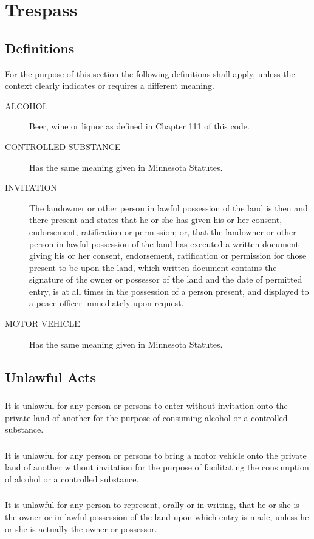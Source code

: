 \section{Trespass}
\subsection{Definitions}
For the purpose of this section the following definitions shall apply, unless the context clearly indicates or requires a different meaning.
\begin{description}
    \item[ALCOHOL] Beer, wine or liquor as defined in Chapter 111 of this code.
    \item[CONTROLLED SUBSTANCE] Has the same meaning given in Minnesota Statutes.
    \item[INVITATION] The landowner or other person in lawful possession of the land is then and there present and states that he or she has given his or her consent, endorsement, ratification or permission; or, that the landowner or other person in lawful possession of the land has executed a written document giving his or her consent, endorsement, ratification or permission for those present to be upon the land, which written document contains the signature of the owner or possessor of the land and the date of permitted entry, is at all times in the possession of a person present, and displayed to a peace officer immediately upon request.
    \item[MOTOR VEHICLE] Has the same meaning given in Minnesota Statutes.
\end{description}
\subsection{Unlawful Acts}
\subsubsection{}
It is unlawful for any person or persons to enter without invitation onto the private land of another for the purpose of consuming alcohol or a controlled substance.
\subsubsection{}
It is unlawful for any person or persons to bring a motor vehicle onto the private land of another without invitation for the purpose of facilitating the consumption of alcohol or a controlled substance.
\subsubsection{}
It is unlawful for any person to represent, orally or in writing, that he or she is the owner or in lawful possession of the land upon which entry is made, unless he or she is actually the owner or possessor.
